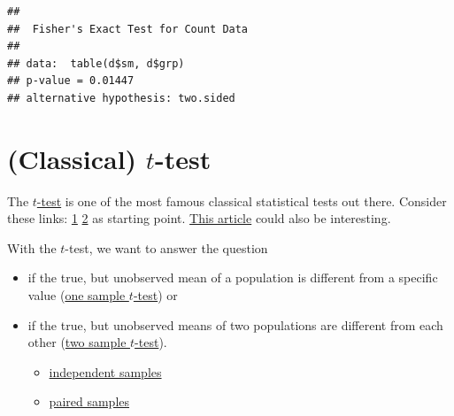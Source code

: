 \documentclass[
]{book}
\newenvironment{Shaded}{\begin{snugshade}}{\end{snugshade}}
\newcommand{\FunctionTok}[1]{\textcolor[rgb]{0.13,0.29,0.53}{\textbf{#1}}}
\newcommand{\NormalTok}[1]{#1}
\newcommand{\SpecialCharTok}[1]{\textcolor[rgb]{0.81,0.36,0.00}{\textbf{#1}}}
\providecommand{\tightlist}{%
  \setlength{\itemsep}{0pt}\setlength{\parskip}{0pt}}
\begin{document}
\begin{Shaded}
\end{Shaded}

\begin{verbatim}
## 
##  Fisher's Exact Test for Count Data
## 
## data:  table(d$sm, d$grp)
## p-value = 0.01447
## alternative hypothesis: two.sided
\end{verbatim}

\section{\texorpdfstring{(Classical) \(t\)-test}{(Classical) t-test}}\label{classical-t-test}

The \href{https://en.wikipedia.org/wiki/Student\%27s_t-test}{\(t\)-test} is one of the most
famous classical statistical tests out there.
Consider these links: \href{https://www.youtube.com/watch?v=pXuFeRCMTAo&ab_channel=VeryNormal}{1}
\href{https://www.youtube.com/watch?v=pLNuDye_tq4&ab_channel=VeryNormal}{2}
as starting point.
\href{https://www.bmj.com/about-bmj/resources-readers/publications/statistics-square-one/7-t-tests}{This article} could also be interesting.

With the \(t\)-test, we want to answer the question

\begin{itemize}
\item
  if the true, but unobserved mean of a population is different from a
  specific value (\href{https://en.wikipedia.org/wiki/Student\%27s_t-test\#One-sample_t-test}{one sample \(t\)-test}) or
\item
  if the true, but unobserved means of two populations are different from each other (\href{https://en.wikipedia.org/wiki/Student\%27s_t-test\#Two-sample_t-tests}{two sample \(t\)-test}).

  \begin{itemize}
  \tightlist
  \item
    \href{https://en.wikipedia.org/wiki/Student\%27s_t-test\#Independent_two-sample_t-test}{independent samples}
  \item
    \href{https://en.wikipedia.org/wiki/Student\%27s_t-test\#Dependent_t-test_for_paired_samples}{paired samples}
  \end{itemize}
\end{itemize}
\end{document}
